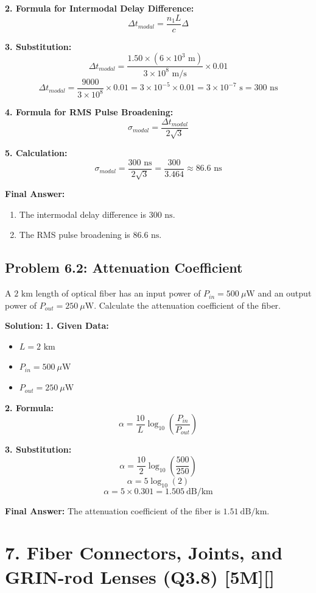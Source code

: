 \textbf{2. Formula for Intermodal Delay Difference:}
\[ \Delta t_{modal} = \frac{n_1 L}{c} \Delta \]

\textbf{3. Substitution:}
\[ \Delta t_{modal} = \frac{1.50 \times (6 \times 10^3\text{ m})}{3 \times 10^8\text{ m/s}} \times 0.01 \]
\[ \Delta t_{modal} = \frac{9000}{3 \times 10^8} \times 0.01 = 3 \times 10^{-5} \times 0.01 = 3 \times 10^{-7}\text{ s} = 300\text{ ns} \]

\textbf{4. Formula for RMS Pulse Broadening:}
\[ \sigma_{modal} = \frac{\Delta t_{modal}}{2\sqrt{3}} \]

\textbf{5. Calculation:}
\[ \sigma_{modal} = \frac{300\text{ ns}}{2\sqrt{3}} = \frac{300}{3.464} \approx 86.6\text{ ns} \]

\textbf{Final Answer:}
\begin{enumerate}
  \item The intermodal delay difference is \textbf{$300\text{ ns}$}.
  \item The RMS pulse broadening is \textbf{$86.6\text{ ns}$}.
\end{enumerate}


\subsection{Problem 6.2: Attenuation Coefficient}
A $2\text{ km}$ length of optical fiber has an input power of $P_{in} = 500\ \mu\text{W}$ and an output power of $P_{out} = 250\ \mu\text{W}$. Calculate the attenuation coefficient of the fiber.

\textbf{Solution:}
\textbf{1. Given Data:}
\begin{itemize}
  \item   $L = 2\text{ km}$
  \item   $P_{in} = 500\ \mu\text{W}$
  \item   $P_{out} = 250\ \mu\text{W}$
\end{itemize}

\textbf{2. Formula:}
\[ \alpha = \frac{10}{L} \log_{10}\left(\frac{P_{in}}{P_{out}}\right) \]

\textbf{3. Substitution:}
\[ \alpha = \frac{10}{2} \log_{10}\left(\frac{500}{250}\right) \]
\[ \alpha = 5 \log_{10}(2) \]
\[ \alpha = 5 \times 0.301 = 1.505\ \text{dB/km} \]

\textbf{Final Answer:}
The attenuation coefficient of the fiber is \textbf{$1.51\ \text{dB/km}$}.


\section{7. Fiber Connectors, Joints, and GRIN-rod Lenses (Q3.8) [5M][]}

